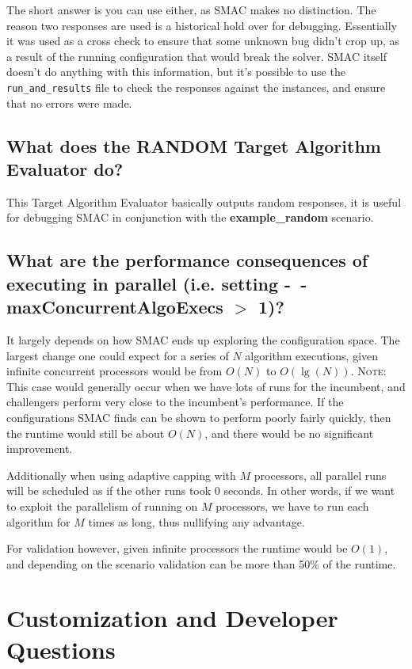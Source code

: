 \documentclass[11pt,letterpaper,oneside]{article}
\begin{document}
The short answer is you can use either, as SMAC makes no distinction. The reason two responses are used is a historical hold over for debugging. Essentially it was used as a cross check to ensure that some unknown bug didn't crop up, as a result of the running configuration that would break the solver. SMAC itself doesn't do anything with this information, but it's possible to use the \texttt{run\_and\_results} file to check the responses against the instances, and ensure that no errors were made.

\subsection{What does the RANDOM Target Algorithm Evaluator do?}

This Target Algorithm Evaluator basically outputs random responses, it is useful for debugging SMAC in conjunction with the \textbf{example\_random} scenario.

\subsection{What are the performance consequences of executing in parallel (i.e. setting \textbf{-~$\!$-maxConcurrentAlgoExecs} $>$ 1)?}
	
	It largely depends on how SMAC ends up exploring the configuration space. The largest change one could expect for a series of $N$ algorithm executions, given infinite concurrent processors would be from $O(N)$ to $O(\lg(N))$. \textsc{Note:} This case would generally occur when we have lots of runs for the incumbent, and challengers perform very close to the incumbent's performance. If the configurations SMAC finds can be shown to perform poorly fairly quickly, then the runtime would still be about $O(N)$, and there would be no significant improvement.
	
	Additionally when using adaptive capping with $M$ processors, all parallel runs will be scheduled as if the other runs took 0 seconds. In other words, if we want to exploit the parallelism of running on $M$ processors, we have to run each algorithm for $M$ times as long, thus nullifying any advantage.
	
	For validation however, given infinite processors the runtime would be $O(1)$, and depending on the scenario validation can be more than 50\% of the runtime.


	
\section{Customization and Developer Questions}
\end{document}
